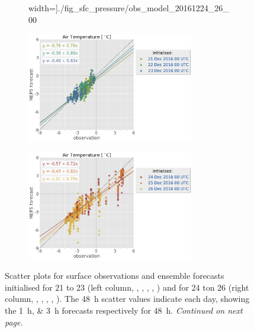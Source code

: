 \begin{figure}[t!]
\begin{subfigure}[b]{0.49\textwidth}
		width=\textwidth]{./fig_sfc_pressure/obs_model_20161224_26_00}
		\caption{}\label{fig:scat:pres2426}
	\end{subfigure}
	\begin{subfigure}[b]{0.49\textwidth}
		\centering
		\includegraphics[trim={25.cm 15.5cm 0cm 3.6cm},clip,
		width=0.8\textwidth]{./fig_sfc_temp/obs_model_20161221_23_00_label}
	\end{subfigure}
	\begin{subfigure}[b]{0.49\textwidth}
		\centering
		\includegraphics[trim={25.cm 15.5cm 0cm 3.6cm},clip,
		width=0.8\textwidth]{./fig_sfc_temp/obs_model_20161224_26_00_label}
	\end{subfigure}
    \caption{Scatter plots for surface observations and ensemble forecasts initialised for \num{21} to \SI{23}{\dec} (left column, \protect{}, \protect{}, \protect{}, \protect{}, \protect{}) and  for \num{24} ton \SI{26}{\dec} (right column, \protect{}, \protect{}, \protect{}, \protect{}, \protect{}). The \SI{48}{\hour} scatter values indicate each day, showing the \SIlist{1;3}{\hour} forecasts respectively for \SI{48}{\hour}. \textit{Continued on next page.}  }\label{fig:scat:obs_meps}
\end{figure}
